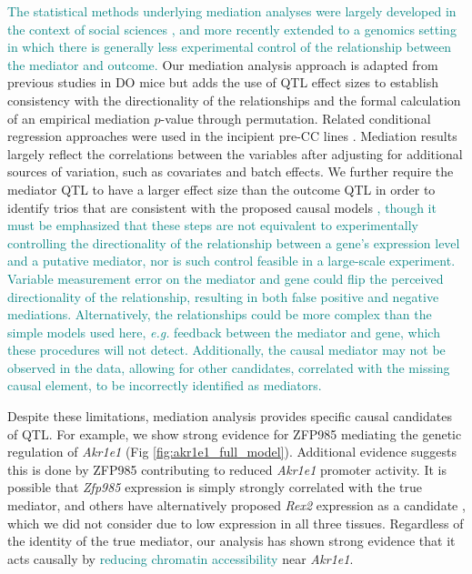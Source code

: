\documentclass[10pt,letterpaper]{article}
\newcommand{\eg}{\emph{e.g.}\xspace}
\newcommand{\GKinline}[1]{\textcolor{teal}{#1}}
\begin{document}
\GKinline{The statistical methods underlying mediation analyses were largely developed in the context of social sciences \cite{Baron1986,Mackinnon2007,Imai2010}, and more recently extended to a genomics setting in which there is generally less experimental control of the relationship between the mediator and outcome.} Our mediation analysis approach is adapted from previous studies in DO mice \cite{Chick2016,Keller2018,Skelly2019} but adds the use of QTL effect sizes to establish consistency with the directionality of the relationships and the formal calculation of an empirical mediation $p$-value through permutation. Related conditional regression approaches were used in the incipient pre-CC lines \cite{Rutledge2014,Kelada2014}.
Mediation results largely reflect the correlations between the variables after adjusting for additional sources of variation, such as covariates and batch effects. We further require the mediator QTL to have a larger effect size than the outcome QTL in order to identify trios that are consistent with the proposed causal models
\GKinline{, though it must be emphasized that these steps are not equivalent to experimentally controlling the directionality of the relationship between a gene's expression level and a putative mediator, nor is such control feasible in a large-scale experiment. Variable measurement error on the mediator and gene could flip the perceived directionality of the relationship, resulting in both false positive and negative mediations. Alternatively, the relationships could be more complex than the simple models used here, \eg feedback between the mediator and gene, which these procedures will not detect. Additionally, the causal mediator may not be observed in the data, allowing for other candidates, correlated with the missing causal element, to be incorrectly identified as mediators.} 

Despite these limitations, mediation analysis provides specific causal candidates of QTL. For example, we show strong evidence for ZFP985 mediating the genetic regulation of \textit{Akr1e1} (Fig \ref{fig:akr1e1_full_model}). Additional evidence suggests this is done by ZFP985 contributing to reduced \textit{Akr1e1} promoter activity. It is possible that \textit{Zfp985} expression is simply strongly correlated with the true mediator, and others have alternatively proposed \textit{Rex2} expression as a candidate \cite{HamiltonWilliams2010}, which we did not consider due to low expression in all three tissues. Regardless of the identity of the true mediator, our analysis has shown strong evidence that it acts causally by \GKinline{reducing chromatin accessibility} near \textit{Akr1e1}.
\end{document}
